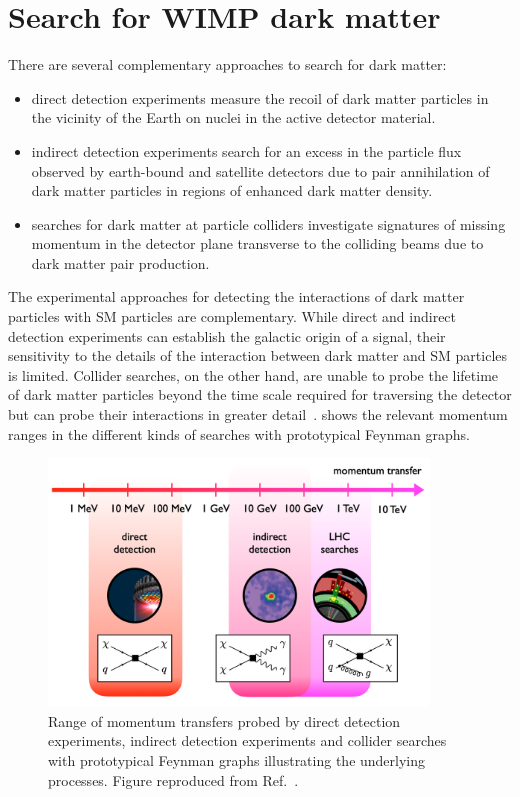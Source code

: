 \section{Search for WIMP dark matter}
\label{sec:dm:searches}
There are several complementary approaches to search for dark matter:
\begin{itemize}
    \item direct detection experiments measure the recoil of dark matter particles in the vicinity of the Earth on nuclei in the active detector material.
    \item indirect detection experiments search for an excess in the particle flux observed by earth-bound and satellite detectors due to pair annihilation of dark matter particles in regions of enhanced dark matter density.
    \item searches for dark matter at particle colliders investigate signatures of missing momentum in the detector plane transverse to the colliding beams due to dark matter pair production.
\end{itemize}
The experimental approaches for detecting the interactions of dark matter particles with SM particles are complementary. While direct and indirect detection experiments can establish the galactic origin of a signal, their sensitivity to the details of the interaction between dark matter and SM particles is limited. Collider searches, on the other hand, are unable to probe the lifetime of dark matter particles beyond the time scale required for traversing the detector but can probe their interactions in greater detail~\cite{Buchmueller2017}.
 shows the relevant momentum ranges in the different kinds of searches with prototypical Feynman graphs.
\begin{figure}[htbp]
    \centering
    \includegraphics[width=0.9\textwidth]{figures/darkmatter/overview_searches.png}
    \caption{Range of momentum transfers probed by direct detection experiments, indirect detection experiments and collider searches with prototypical Feynman graphs illustrating the underlying processes. Figure reproduced from Ref.~\cite{Abe2020}.}
    \label{fig:darkmatter:searches:overview}
\end{figure}


